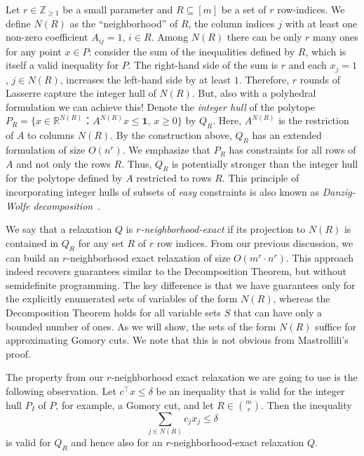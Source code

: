 \documentclass[11pt]{article}
\newcommand{\Z}{\mathbb{Z}}
\newcommand{\one}{\mathbf{1}}
\theoremstyle{remark}
\begin{document}
\medskip
\noindent
Let $r \in \Z_{\ge 1}$ be a small parameter and $R ⊆ [m]$ be a set of $r$ row-indices.
We define
$N(R)$ as the ``neighborhood'' of $R$, the column indices $j$
with at least one non-zero coefficient $A_{ij} = 1$, $i\in R$.
Among $N(R)$ there can be only $r$ many ones for any point $x\in P$:
consider the sum of the inequalities defined by $R$, which is itself a valid inequality for $P$.
The right-hand side of the sum is $r$ and each $x_j = 1$, $j\in N(R)$, increases the left-hand side by at least $1$.
Therefore, $r$ rounds of Lasserre capture the integer hull of $N(R)$.
But, also with a polyhedral formulation we can achieve this!
Denote the \emph{integer hull} of the polytope $P_R = \{ x ∈ ℝ^{N(R)} ： A^{N(R)} x ≤ \one, \, x≥0\}$ by $Q_R$.
Here, $A^{N(R)}$ is the restriction of $A$ to columns $N(R)$.
By the construction above, $Q_R$ has an extended formulation of size $O(n^r)$.
We emphasize that $P_R$ has constraints for all rows of $A$ and not only the rows $R$. Thus, $Q_R$ is potentially
stronger than the integer hull for the polytope defined by $A$ restricted to rows $R$. This  principle of incorporating integer hulls of subsets of \emph{easy} constraints is also known as \emph{Danzig-Wolfe decomposition}~\cite{dantzig1960decomposition}. 

We say that a relaxation $Q$ is \emph{$r$-neighborhood-exact} if its projection to $N(R)$ is contained in $Q_R$ for
any set $R$ of $r$ row indices.
From our previous discussion, we can build an $r$-neighborhood exact relaxation of size $O(m^r ⋅ n^r)$.
This approach indeed recovers guarantees similar to the Decomposition Theorem, but without
semidefinite programming. 
The key difference is that we have guarantees only for the explicitly enumerated
sets of variables of the form $N(R)$, whereas
the Decomposition Theorem holds for all variable sets $S$ that can have only a bounded number of ones.
As we will show, the sets of the form $N(R)$ suffice for approximating Gomory cuts.
We note that this is not obvious from Mastrollili's proof.

The property from our $r$-neighborhood exact relaxation we are going to use is the following observation.
Let $c^\intercal x ≤δ$ be an inequality that is valid for the integer hull $P_I$ of $P$,
for example, a Gomory cut, and let $R ∈ \binom{m}{r}$. 
  Then the inequality
\begin{equation}
  \label{eq:nb}  
  ∑_{j ∈ N(R)} c_j x_j ≤ δ  
\end{equation}
is valid for $Q_R$ and hence also for an $r$-neighborhood-exact relaxation $Q$. 
\end{document}
